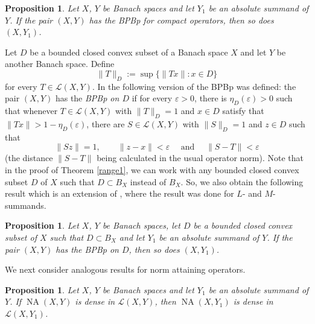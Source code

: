 \documentclass[10pt,a4paper]{amsart}
\theoremstyle{plain}
\newtheorem{prop}[theorem]{Proposition}
\theoremstyle{definition}
\newcommand{\eps}{\varepsilon}
\DeclareMathOperator{\NA}{NA}
\begin{document}
\begin{prop} \label{range2} Let $X$, $Y$ be Banach spaces and let $Y_1$ be an absolute summand of $Y$. If the pair $(X, Y)$ has the BPBp for compact operators, then so does $(X, Y_1)$.
\end{prop}

Let $D$ be a bounded closed convex subset of a Banach space $X$ and let $Y$ be another Banach space. Define $$\|T\|_D := \sup \{\|Tx\|: x \in D\}$$ for every $T \in \mathcal{L}(X, Y)$. In \cite{Cho-Choi} the following version of the BPBp was defined: the pair $(X, Y)$ has the {\it BPBp on $D$} if for every $\eps > 0$, there is $\eta_D (\eps) > 0$ such that whenever $T \in \mathcal{L}(X, Y)$ with $\|T\|_D = 1$ and $x \in D$ satisfy that $\|Tx\| > 1 - \eta_D(\eps)$, there are $S \in \mathcal{L}(X, Y)$ with $\|S\|_D = 1$ and $z \in D$ such that $$\|Sz\| = 1, \qquad \|z - x\| < \eps \quad \text{ and } \quad \|S - T\| < \eps$$ (the distance $\|S - T\|$ being calculated in the usual operator norm). Note that in the proof of Theorem \ref{range1}, we can work with any bounded closed convex subset $D$ of $X$ such that $D \subset B_X$ instead of $B_X$. So, we also obtain the following result which is an extension of \cite[Propositions 4.3 and 4.5]{Cho-Choi}, where the result was done for $L$- and $M$-summands.


\begin{prop} \label{range3} Let $X$, $Y$ be Banach spaces, let $D$ be a bounded closed convex subset of $X$ such that $D \subset B_X$ and let $Y_1$ be an absolute summand of $Y$. If the pair $(X, Y)$ has the BPBp on $D$, then so does $(X, Y_1)$.
\end{prop}

We next consider analogous results for norm attaining operators.

\begin{prop} \label{NA4} Let $X$, $Y$ be Banach spaces and let $Y_1$ be an absolute summand of $Y$. If $\NA(X, Y)$ is dense in $\mathcal{L}(X, Y)$, then $\NA(X, Y_1)$ is dense in $\mathcal{L}(X, Y_1)$.	
\end{prop}
\end{document}
